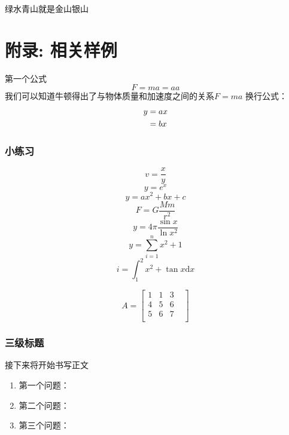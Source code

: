 \documentclass[UTF8]{ctexart}
\begin{document}
绿水青山就是金山银山




\section{附录: 相关样例}
第一个公式
\begin{equation}
	F=ma=aa
\end{equation}
我们可以知道牛顿得出了与物体质量和加速度之间的关系$F=ma$
换行公式：
\begin{align}
	y & =ax\notag \\
	  & =bx
\end{align}

\subsubsection{小练习}
\begin{equation}
	v=\frac{x}{y}
\end{equation}
\begin{equation}
	y=e^{x}
\end{equation}
\begin{equation}
	y=ax^2+bx+c
\end{equation}
\begin{equation}
	F=G\frac{Mm}{r^2}
\end{equation}
\begin{equation}
	y=4\pi \frac{\sin{x}}{\ln{x^2}}
\end{equation}
\begin{equation}
	y=\sum^{n}_{i=1} x^2+1
\end{equation}
\begin{equation}
	i=\int_{1}^{2}x^2+\tan{x}\mathrm{d}x
\end{equation}

\begin{equation}
	A=\begin{bmatrix}
		1 & 1 & 3 \\4&5&6\\5&6&7&\\
	\end{bmatrix}
\end{equation}
\subsubsection{三级标题}

接下来将开始书写正文
\begin{enumerate}
	\item 第一个问题：
	\item 第二个问题：
	\item 第三个问题：
\end{enumerate}
\end{document}
